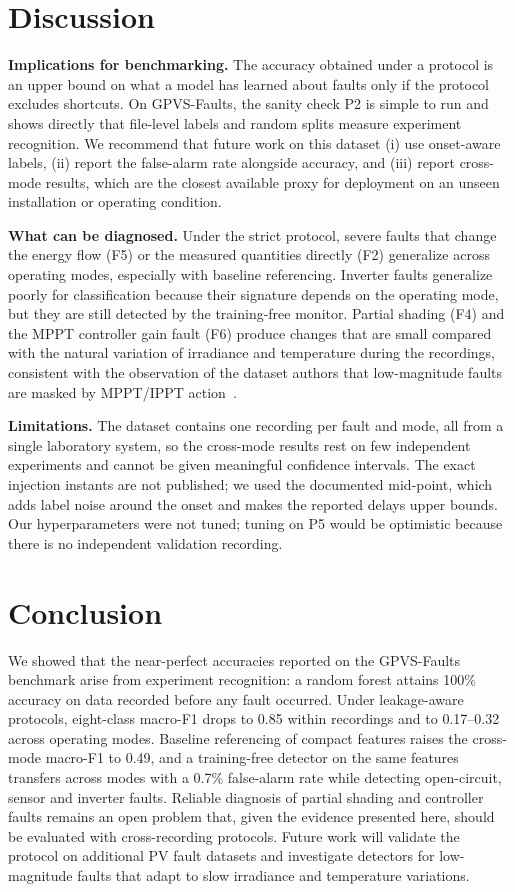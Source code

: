 \documentclass[conference]{IEEEtran}
\begin{document}
\section{Discussion}
\textbf{Implications for benchmarking.} The accuracy obtained under a protocol is an upper bound on what a model has learned about faults only if the protocol excludes shortcuts. On GPVS-Faults, the sanity check P2 is simple to run and shows directly that file-level labels and random splits measure experiment recognition. We recommend that future work on this dataset (i) use onset-aware labels, (ii) report the false-alarm rate alongside accuracy, and (iii) report cross-mode results, which are the closest available proxy for deployment on an unseen installation or operating condition.

\textbf{What can be diagnosed.} Under the strict protocol, severe faults that change the energy flow (F5) or the measured quantities directly (F2) generalize across operating modes, especially with baseline referencing. Inverter faults generalize poorly for classification because their signature depends on the operating mode, but they are still detected by the training-free monitor. Partial shading (F4) and the MPPT controller gain fault (F6) produce changes that are small compared with the natural variation of irradiance and temperature during the recordings, consistent with the observation of the dataset authors that low-magnitude faults are masked by MPPT/IPPT action~\cite{bakdi2020gpvs}.

\textbf{Limitations.} The dataset contains one recording per fault and mode, all from a single laboratory system, so the cross-mode results rest on few independent experiments and cannot be given meaningful confidence intervals. The exact injection instants are not published; we used the documented mid-point, which adds label noise around the onset and makes the reported delays upper bounds. Our hyperparameters were not tuned; tuning on P5 would be optimistic because there is no independent validation recording.

\section{Conclusion}
We showed that the near-perfect accuracies reported on the GPVS-Faults benchmark arise from experiment recognition: a random forest attains 100\% accuracy on data recorded before any fault occurred. Under leakage-aware protocols, eight-class macro-F1 drops to 0.85 within recordings and to 0.17--0.32 across operating modes. Baseline referencing of compact features raises the cross-mode macro-F1 to 0.49, and a training-free detector on the same features transfers across modes with a 0.7\% false-alarm rate while detecting open-circuit, sensor and inverter faults. Reliable diagnosis of partial shading and controller faults remains an open problem that, given the evidence presented here, should be evaluated with cross-recording protocols. Future work will validate the protocol on additional PV fault datasets and investigate detectors for low-magnitude faults that adapt to slow irradiance and temperature variations.
\end{document}
